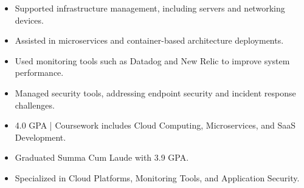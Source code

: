 \par\smallskip
\noindent
\begin{minipage}{20cm}
  \begin{minipage}{9.75cm}
    \begin{itemize}
      \item Supported infrastructure management, including servers and networking devices.
      \item Assisted in microservices and container-based architecture deployments.
    \end{itemize}
  \end{minipage}
  \hfill
  \begin{minipage}{9.75cm}
    \begin{itemize}
      \item Used monitoring tools such as Datadog and New Relic to improve system performance.
      \item Managed security tools, addressing endpoint security and incident response challenges.
    \end{itemize}
  \end{minipage}
\end{minipage}
\par\smallskip
\divider

\begin{itemize}
  \item 4.0 GPA | Coursework includes Cloud Computing, Microservices, and SaaS Development.
\end{itemize}
\divider

\begin{itemize}
  \item Graduated Summa Cum Laude with 3.9 GPA.
  \item Specialized in Cloud Platforms, Monitoring Tools, and Application Security.
\end{itemize}

\noindent
\begin{minipage}{20cm}
\end{minipage}


